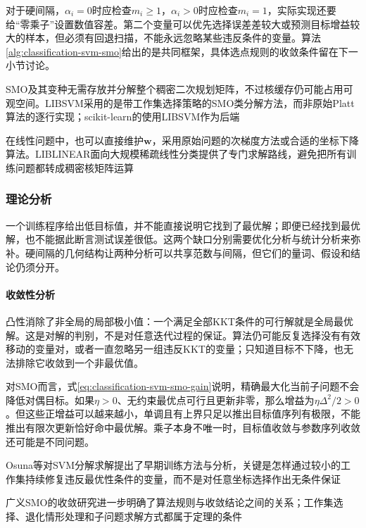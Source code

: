 对于硬间隔，$\alpha_i=0$时应检查$m_i\ge1$，$\alpha_i>0$时应检查$m_i=1$，实际实现还要给“零乘子”设置数值容差。第二个变量可以优先选择误差差较大或预测目标增益较大的样本，但必须有回退扫描，不能永远忽略某些违反条件的变量。算法\ref{alg:classification-svm-smo}给出的是共同框架，具体选点规则的收敛条件留在下一小节讨论。

SMO及其变种无需存放并分解整个稠密二次规划矩阵，不过核缓存仍可能占用可观空间。LIBSVM采用的是带工作集选择策略的SMO类分解方法，而非原始Platt算法的逐行实现；scikit-learn的使用LIBSVM作为后端

在线性问题中，也可以直接维护$\bm{w}$，采用原始问题的次梯度方法或合适的坐标下降算法。LIBLINEAR面向大规模稀疏线性分类提供了专门求解路线，避免把所有训练问题都转成稠密核矩阵运算

\subsubsection{理论分析}
\label{sec:classification-svm-analysis}

一个训练程序给出低目标值，并不能直接说明它找到了最优解；即便已经找到最优解，也不能据此断言测试误差很低。这两个缺口分别需要优化分析与统计分析来弥补。硬间隔的几何结构让两种分析可以共享范数与间隔，但它们的量词、假设和结论仍须分开。

\paragraph{收敛性分析}
\label{sec:classification-svm-convergence}

凸性消除了非全局的局部极小值：一个满足全部KKT条件的可行解就是全局最优解。这是对解的判别，不是对任意迭代过程的保证。算法仍可能反复选择没有有效移动的变量对，或者一直忽略另一组违反KKT的变量；只知道目标不下降，也无法排除它收敛到一个非最优值。

对SMO而言，式\eqref{eq:classification-svm-smo-gain}说明，精确最大化当前子问题不会降低对偶目标。如果$\eta>0$、无约束最优点可行且更新非零，那么增益为$\eta\Delta^2/2>0$。但这些正增益可以越来越小，单调且有上界只足以推出目标值序列有极限，不能推出有限次更新恰好命中最优解。乘子本身不唯一时，目标值收敛与参数序列收敛还可能是不同问题。

Osuna等对SVM分解求解提出了早期训练方法与分析，关键是怎样通过较小的工作集持续修复违反最优性条件的变量，而不是对任意坐标选择作出无条件保证

广义SMO的收敛研究进一步明确了算法规则与收敛结论之间的关系；工作集选择、退化情形处理和子问题求解方式都属于定理的条件

